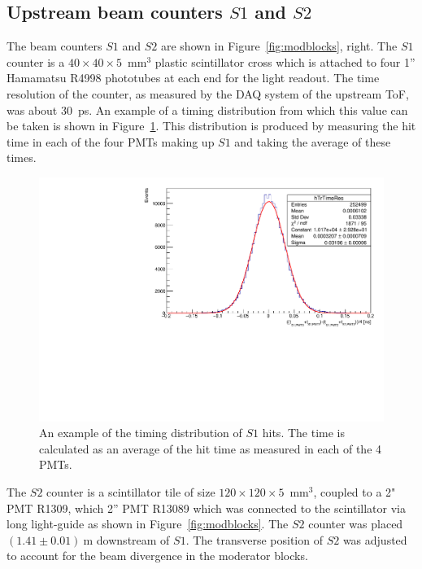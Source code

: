 \subsection{Upstream beam counters $\mathit{S1}$ and $\mathit{S2}$}
\label{subsec:s1s2Exp}
The beam counters $\mathit{S1}$ and $\mathit{S2}$ are shown in Figure~\ref{fig:modblocks}, right.
The $\mathit{S1}$ counter is a $40\times40\times5$~mm$^3$ plastic scintillator cross which is attached to four 1'' Hamamatsu R4998 phototubes at each end for the light readout.
The time resolution of the counter, as measured by the DAQ system of the upstream ToF, was about 30~ps.
An example of a timing distribution from which this value can be taken is shown in Figure~\ref{fig:s3Res}.
This distribution is produced by measuring the hit time in each of the four PMTs making up $\mathit{S1}$ and taking the average of these times.
\begin{figure}
  \centering
  \includegraphics[width=0.7\linewidth]{files/Figures/TrTimeRes.pdf}
  \caption{An example of the timing distribution of $\mathit{S1}$ hits. The time is calculated as an average of the hit time as measured in each of the 4 PMTs.}
  \label{fig:s3Res}
\end{figure}


The $\mathit{S2}$ counter is a scintillator tile of size $120\times120\times5$~mm$^3$, coupled to a 2" PMT R1309, which  2'' PMT R13089 which was connected to the scintillator via long light-guide as shown in Figure~\ref{fig:modblocks}.
The $\mathit{S2}$ counter was placed $(1.41 \pm 0.01)~\text{m}$  downstream of $\mathit{S1}$.
The transverse position of $\mathit{S2}$ was adjusted to account for the beam divergence in the moderator blocks.

